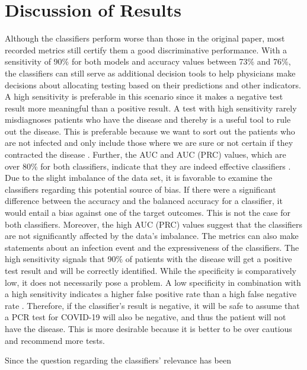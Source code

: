 \section{Discussion of Results}
Although the classifiers perform worse than those in the original paper, 
most recorded metrics still certify them a good discriminative performance.
With a sensitivity of 90\% for both models and accuracy values between 73\% and 
76\%, the classifiers can still serve as additional decision tools to help 
physicians make decisions about allocating testing based on their predictions 
and other indicators. 
A high sensitivity is preferable in this scenario since it makes a negative test 
result more meaningful than a positive result. A test with high sensitivity 
rarely misdiagnoses patients who have the disease and thereby is a useful tool 
to rule out the disease. This is preferable because we want to sort out the 
patients who are not infected and only include those where we are sure or not 
certain if they contracted the disease \cite{RN168}.
Further, the AUC and AUC (PRC) values, which are over 80\% 
for both classifiers, indicate that they are indeed effective classifiers 
\cite{RN167}.
Due to the slight imbalance of the data set, it is  favorable to examine the 
classifiers regarding this potential source of bias. If there were a 
significant difference between the accuracy and the balanced accuracy for a 
classifier, it 
would entail a bias against one of the target outcomes. This is not the case 
for both classifiers. Moreover, the high AUC (PRC) values suggest that 
the classifiers are not significantly affected by the data's imbalance.
The metrics can also make statements about an infection event and the 
expressiveness of the classifiers. The high sensitivity signals that 90\% of 
patients with the disease will get a positive test result and will be correctly 
identified. 
While the specificity is comparatively low, it does not necessarily pose a 
problem. A low specificity in combination with a high sensitivity indicates a 
higher false positive rate than a high false negative rate \cite{RN168}.
Therefore, if the classifier's result is negative, it will be safe to 
assume that a PCR test for COVID-19 will also be negative, and thus the patient 
will not have the disease.
This is more desirable because it is better to be over cautious and recommend 
more tests.
\par
Since the question regarding the classifiers' relevance has been 
